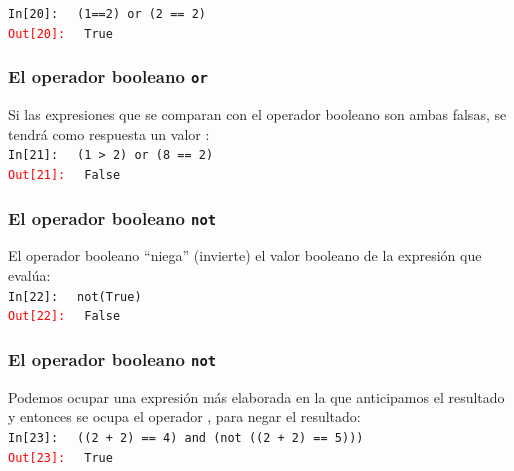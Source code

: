 {\begin{frame}[fragile]
\bigskip
\pause
\textcolor{ao}{\texttt{In[20]: }} \verb| (1==2) or (2 == 2)| \\
\pause
\textcolor{red}{\texttt{Out[20]: }} \verb| True|
\end{frame}
\begin{frame}[fragile]
\frametitle{El operador booleano \texttt{or}}
Si las expresiones que se comparan con el operador booleano  son ambas falsas, se tendrá como respuesta un valor :
\\
\bigskip
\pause
\textcolor{ao}{\texttt{In[21]: }} \verb| (1 > 2) or (8 == 2)| \\
\pause
\textcolor{red}{\texttt{Out[21]: }} \verb| False|
\end{frame}
\begin{frame}[fragile]
\frametitle{El operador booleano \texttt{not}}
El operador booleano  \enquote{niega} (invierte) el valor booleano de la expresión que evalúa:
\\
\bigskip
\pause
\textcolor{ao}{\texttt{In[22]: }} \verb| not(True)| \\
\pause
\textcolor{red}{\texttt{Out[22]: }} \verb| False|
\end{frame}
\begin{frame}[fragile]
\frametitle{El operador booleano \texttt{not}}
Podemos ocupar una expresión más elaborada en la que anticipamos el resultado y entonces se ocupa el operador , para negar el resultado:
\\
\bigskip
\pause
\textcolor{ao}{\texttt{In[23]: }} \verb| ((2 + 2) == 4) and (not ((2 + 2) == 5)))| \\
\pause
\textcolor{red}{\texttt{Out[23]: }} \verb| True|
\end{frame}
}
